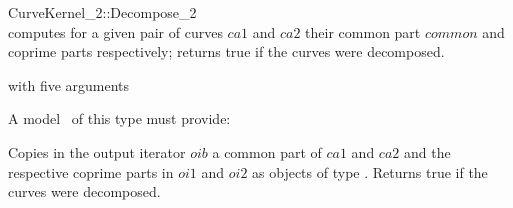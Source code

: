 \begin{ccRefFunctionObjectConcept}{CurveKernel_2::Decompose_2}
\ccSeeAlso
{}\\

\ccDefinition
computes for a given pair of curves $ca1$ and $ca2$ their common part $common$ and coprime parts  respectively; returns true if the curves were decomposed.

\ccRefines 
{} with five arguments 

\ccOperations
{}
A model \ccVar\ of this type must provide:

{ Copies in the output iterator $oib$ a common part of $ca1$ and $ca2$ and the respective coprime parts in $oi1$ and $oi2$ as objects of type .
Returns true if the curves were decomposed.}

\ccSeeAlso
{}\\


\end{ccRefFunctionObjectConcept}

